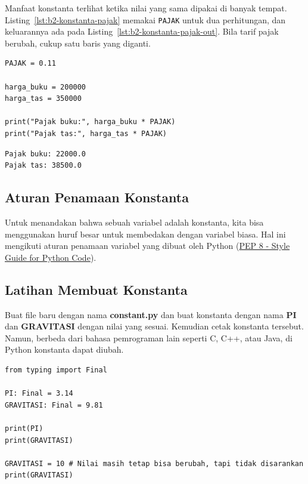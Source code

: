 Manfaat konstanta terlihat ketika nilai yang sama dipakai di banyak tempat. Listing~\ref{lst:b2-konstanta-pajak} memakai \texttt{PAJAK} untuk dua perhitungan, dan keluarannya ada pada Listing~\ref{lst:b2-konstanta-pajak-out}. Bila tarif pajak berubah, cukup satu baris yang diganti.

\begin{lstlisting}[style=PythonStyle, caption={Kode Python: pajak.py}, label={lst:b2-konstanta-pajak}]
PAJAK = 0.11

harga_buku = 200000
harga_tas = 350000

print("Pajak buku:", harga_buku * PAJAK)
print("Pajak tas:", harga_tas * PAJAK)
\end{lstlisting}

\begin{lstlisting}[language=bash, caption={Keluaran pajak.py}, label={lst:b2-konstanta-pajak-out}]
Pajak buku: 22000.0
Pajak tas: 38500.0
\end{lstlisting}

\subsection{Aturan Penamaan Konstanta}

Untuk menandakan bahwa sebuah variabel adalah konstanta, kita bisa menggunakan huruf besar untuk membedakan dengan variabel biasa. Hal ini mengikuti aturan penamaan variabel yang dibuat oleh Python (\href{https://peps.python.org/pep-0008/}{PEP 8 - Style Guide for Python Code}).

\subsection{Latihan Membuat Konstanta}

Buat file baru dengan nama \textbf{constant.py} dan buat konstanta dengan nama \textbf{PI} dan \textbf{GRAVITASI} dengan nilai yang sesuai. Kemudian cetak konstanta tersebut. Namun, berbeda dari bahasa pemrograman lain seperti C, C++, atau Java, di Python konstanta dapat diubah.
\begin{lstlisting}[style=PythonStyle, caption={Kode Python: constant.py}, label={lst:b2-constant}]
from typing import Final

PI: Final = 3.14
GRAVITASI: Final = 9.81

print(PI)
print(GRAVITASI)

GRAVITASI = 10 # Nilai masih tetap bisa berubah, tapi tidak disarankan
print(GRAVITASI)
\end{lstlisting}

